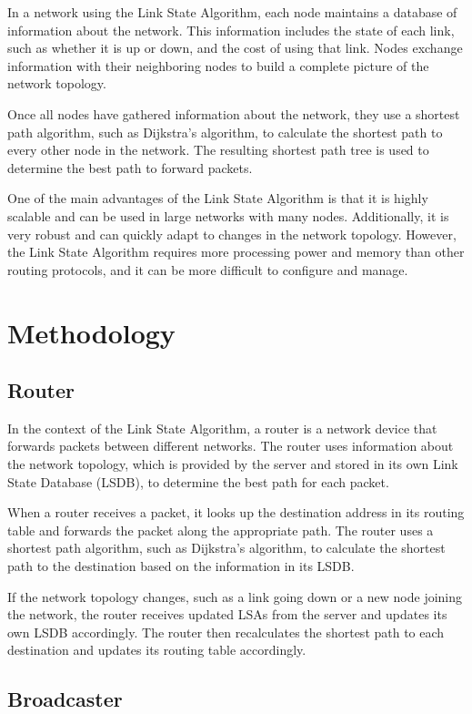 \documentclass[11pt]{article}
\begin{document}
In a network using the Link State Algorithm, each node maintains a database of information about the network. This information includes the state of each link, such as whether it is up or down, and the cost of using that link. Nodes exchange information with their neighboring nodes to build a complete picture of the network topology.

Once all nodes have gathered information about the network, they use a shortest path algorithm, such as Dijkstra's algorithm, to calculate the shortest path to every other node in the network. The resulting shortest path tree is used to determine the best path to forward packets.

One of the main advantages of the Link State Algorithm is that it is highly scalable and can be used in large networks with many nodes. Additionally, it is very robust and can quickly adapt to changes in the network topology. However, the Link State Algorithm requires more processing power and memory than other routing protocols, and it can be more difficult to configure and manage.


\section{Methodology}

\subsection{Router}

In the context of the Link State Algorithm, a router is a network device that forwards packets between different networks. The router uses information about the network topology, which is provided by the server and stored in its own Link State Database (LSDB), to determine the best path for each packet.

When a router receives a packet, it looks up the destination address in its routing table and forwards the packet along the appropriate path. The router uses a shortest path algorithm, such as Dijkstra's algorithm, to calculate the shortest path to the destination based on the information in its LSDB.

If the network topology changes, such as a link going down or a new node joining the network, the router receives updated LSAs from the server and updates its own LSDB accordingly. The router then recalculates the shortest path to each destination and updates its routing table accordingly.


\subsection{Broadcaster}
\end{document}
